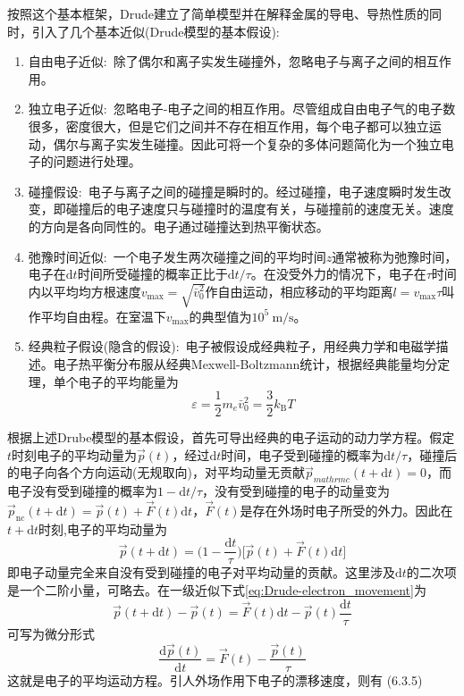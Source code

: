 按照这个基本框架，Drude建立了简单模型并在解释金属的导电、导热性质的同时，引入了几个基本近似(Drude模型的基本假设):
\begin{enumerate}
	\item 自由电子近似:~除了偶尔和离子实发生碰撞外，忽略电子与离子之间的相互作用。 
	\item 独立电子近似:~忽略电子-电子之间的相互作用。尽管组成自由电子气的电子数很多，密度很大，但是它们之间并不存在相互作用，每个电子都可以独立运动，偶尔与离子实发生碰撞。因此可将一个复杂的多体问题简化为一个独立电子的问题进行处理。

	\item 碰撞假设:~电子与离子之间的碰撞是瞬时的。经过碰撞，电子速度瞬时发生改变，即碰撞后的电子速度只与碰撞时的温度有关，与碰撞前的速度无关。速度的方向是各向同性的。电子通过碰撞达到热平衡状态。

	\item 弛豫时间近似:~一个电子发生两次碰撞之间的平均时间$z$通常被称为弛豫时间，电子在$\mathrm{d}t$时间所受碰撞的概率正比于$\mathrm{d}t/\tau$。在没受外力的情况下，电子在$\tau$时间内以平均均方根速度$v_{\max}=\sqrt{\bar{v}_0^2}$作自由运动，相应移动的平均距离$l=v_{\max}\tau$叫作平均自由程。在室温下$v_{\max}$的典型值为$10^5~\mathrm{m/s}$。

	\item 经典粒子假设(隐含的假设):~电子被假设成经典粒子，用经典力学和电磁学描述。电子热平衡分布服从经典Mexwell-Boltzmann统计，根据经典能量均分定理，单个电子的平均能量为
		\begin{displaymath}
			\varepsilon=\dfrac12m_e\bar{v}_0^2=\dfrac32k_{\mathrm{B}}T
		\end{displaymath}
\end{enumerate}
根据上述Drube模型的基本假设，首先可导出经典的电子运动的动力学方程。假定$t$时刻电子的平均动量为$\vec p(t)$，经过$\mathrm{d}t$时间，电子受到碰撞的概率为$\mathrm{d}t/\tau$，碰撞后的电子向各个方向运动(无规取向)，对平均动量无贡献$\vec p_{mathrm c}(t+\mathrm{d}t)=0$，而电子没有受到碰撞的概率为$1-\mathrm{d}t/\tau$，没有受到碰撞的电子的动量变为$\vec p_{\mathrm{nc}}(t+\mathrm{d}t)=\vec p(t)+\vec F(t)\mathrm{d}t$，$\vec F(t)$是存在外场时电子所受的外力。因此在$t+\mathrm{d}t$时刻,电子的平均动量为
\begin{equation}
	\vec p(t+\mathrm{d}t)=\bigg(1-\dfrac{\mathrm{d}t}{\tau}\bigg)\bigg[\vec p(t)+\vec F(t)\mathrm{d}t\bigg]
	\label{eq:Drude-electron_movement}
\end{equation} 
即电子动量完全来自没有受到碰撞的电子对平均动量的贡献。这里涉及$\mathrm{d}t$的二次项是一个二阶小量，可略去。在一级近似下式\eqref{eq:Drude-electron_movement}为
\begin{equation}
	\vec p(t+\mathrm{d}t)-\vec p(t)=\vec F(t)\mathrm{d}t-\vec p(t)\dfrac{\mathrm{d}t}{\tau}
	\label{eq:Drude-electron_movement-2}
\end{equation} 
可写为微分形式
\begin{equation}
	\dfrac{\mathrm{d}\vec p(t)}{\mathrm{d}t}=\vec F(t)-\dfrac{\vec p(t)}{\tau}
	\label{eq:Drude-electron_movement-3}
\end{equation} 
这就是电子的平均运动方程。引人外场作用下电子的漂移速度，则有
(6.3.5)

